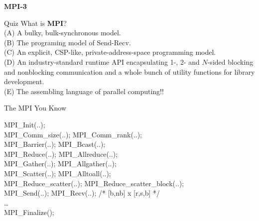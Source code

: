 \documentclass[11pt]{beamer}
\begin{document}
\begin{frame}{} \LARGE
  \begin{center}
      \textbf{MPI-3}
  \end{center}
\end{frame}

\begin{frame}{Quiz} \Large
    What is \textbf{MPI}? \\
    (A) A bulky, bulk-synchronous model. \\
    (B) The programing model of Send-Recv. \\
    (C) An explicit, CSP-like, private-address-space programming model. \\
    (D) An industry-standard runtime API encapsulating
        1-, 2- and $N$-sided blocking and nonblocking communication
        and a whole bunch of utility functions for library development. \\
    (E) The assembling language of parallel computing!!
\end{frame}

\begin{frame}{The MPI You Know}
    \begin{tt}
        MPI\_Init(..); \\
        MPI\_Comm\_size(..); MPI\_Comm\_rank(..); \\
        MPI\_Barrier(..); MPI\_Bcast(..); \\
        MPI\_Reduce(..); MPI\_Allreduce(..); \\
        MPI\_Gather(..); MPI\_Allgather(..); \\
        MPI\_Scatter(..); MPI\_Alltoall(..); \\
        MPI\_Reduce\_scatter(..); MPI\_Reduce\_scatter\_block(..); \\
        MPI\_Send(..); MPI\_Recv(..); /* [b,nb] x [r,s,b] */ \\
        \ldots \\
        MPI\_Finalize();
    \end{tt}
\end{frame}

\end{document}
